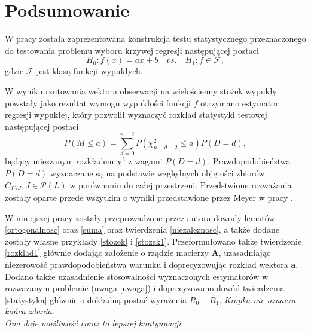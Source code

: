 \documentclass[12pt]{mwart}
\begin{document}
\section{Podsumowanie}
W pracy została zaprezentowana konstrukcja testu statystycznego przeznaczonego do testowania problemu wyboru krzywej regresji następującej postaci
$$
H_0\colon f(x)=ax+b \quad vs.\quad H_1\colon f\in \mathcal{F},
$$
gdzie $\mathcal{F}$ jest klasą funkcji wypukłych.

W wyniku rzutowania wektora obserwacji na wielościenny stożek wypukły powstały jako rezultat wymogu wypukłości funkcji $f$ otrzymano estymator regresji wypukłej, który pozwolił wyznaczyć rozkład statystyki testowej następującej postaci
$$
P(M\leq a)=\sum_{d=0}^{n-2}{P(\chi^2_{n-d-2}\leq a)P(D=d)},
$$
będący mieszanym rozkładem $\chi^2$ z wagami $P(D=d)$. Prawdopodobieństwa $P(D=d)$ wyznaczane są na podstawie względnych objętości zbiorów $C_{L\setminus J},J\in \mathcal{P}(L)$ w porównaniu do całej przestrzeni.
Przedstwione rozważania zostały oparte przede wszytkim o wyniki przedstawione przez Meyer w pracy \cite{meyer}. 

W niniejszej pracy zostały przeprowadzone przez autora dowody lematów \ref{ortogonalnosc} oraz \ref{suma} oraz twierdzenia \ref{niezaleznosc}, a także dodane zostały własne przykłady \ref{stozek} i \ref{stozek1}. Przeformułowano także twierdzenie \ref{rozklad1} głównie dodając założenie o rządzie macierzy $\pmb{A}$, uzasadniając niezerowość prawdopodobieństwa warunku i doprecyzowując rozkład wektora $\pmb{a}$. Dodano także uzasadnienie stosowalności wyznaczonych estymatorów w rozważanym problemie (uwaga \ref{uwaga}) i doprecyzowano dowód twierdzenia \ref{statystyka} głównie o dokładną postać wyrażenia $R_0-R_1$.
\flushright
{\small \textit{Kropka nie oznacza końca zdania.\\
Ona daje możliwość coraz to lepszej kontynuacji.}} 
\flushleft
\end{document}
